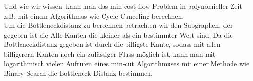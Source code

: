 \documentclass[11pt, a4paper,draft]{report}
\begin{document}
 	Und wie wir wissen, kann man das min-cost-flow Problem in polynomieller Zeit z.B. mit einem Algorithmus wie Cycle Canceling berechnen.\\
 	Um die Bottleneckdistanz zu berechnen betrachten wir den Subgraphen, der gegeben ist die Alle Kanten die kleiner als ein bestimmter Wert sind. Da die Bottleneckdistanz gegeben ist durch die billigste Kante, sodass mit allen billigerern Kanten noch ein zulässiger Fluss möglich ist, kann man mit logarithmisch vielen Aufrufen eines min-cut Algorithmuses mit einer Methode wie Binary-Search die Bottleneck-Distanz bestimmen.
 	
\end{document}
